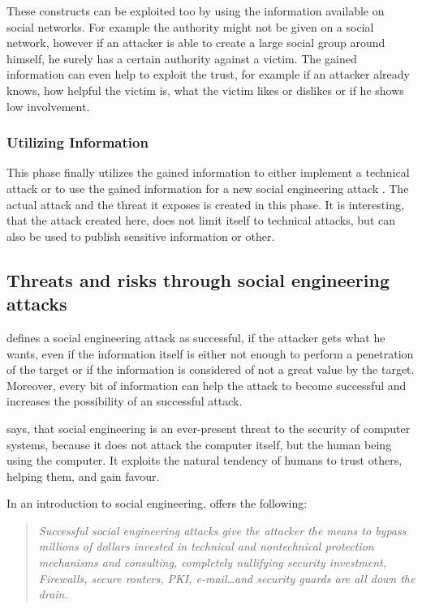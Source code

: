 These constructs can be exploited too by using the information available on
social networks. For example the authority might not be given on a social
network, however if an attacker is able to create a large social group around
himself, he surely has a certain authority against a victim. The gained
information can even help to exploit the trust, for example if an attacker
already knows, how helpful the victim is, what the victim likes or dislikes or if
he shows low involvement.

\subsubsection{Utilizing Information}

This phase finally utilizes the gained information to either implement a
technical attack or to use the gained information for a new social engineering
attack \cite{thornburgh2004}. The actual attack and the threat it exposes is
created in this phase. It is interesting, that the attack created here, does
not limit itself to technical attacks, but can also be used to publish
sensitive information or other.

\subsection{Threats and risks through social engineering attacks}

\cite{thornburgh2004} defines a social engineering attack as successful, if the
attacker gets what he wants, even if the information itself is either not
enough to perform a penetration of the target or if the information is
considered of not a great value by the target. Moreover, every bit of
information can help the attack to become successful and increases the
possibility of an successful attack.

\cite{orgill2004} says, that social engineering is an ever-present threat to
the security of computer systems, because it does not attack the computer
itself, but the human being using the computer. It exploits the natural
tendency of humans to trust others, helping them, and gain favour.

In an introduction to social engineering, \cite{manske2000} offers the following:

\begin{quote}
\textit{Successful social engineering attacks give the attacker the means to bypass
millions of dollars invested in technical and nontechnical protection
mechanisms and consulting, completely nullifying security investment,
Firewalls, secure routers, PKI, e-mail\dots and security guards are all down
the drain.}
\end{quote}


